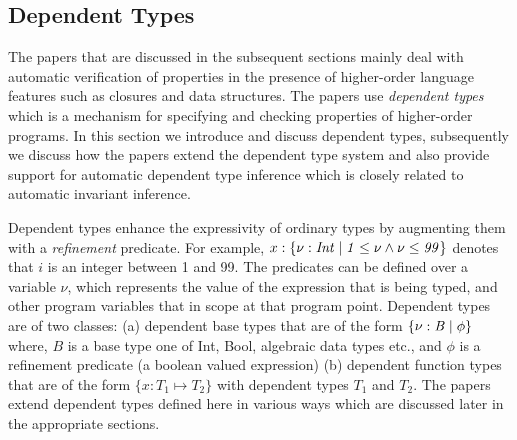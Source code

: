 \newcommand{\dt}[2]{\mathit{\{ #1 \vbar #2\}}}
\newcommand{\subtype}{\mathit{<:}}
\newcommand{\sem}[1]{\sembrack{#1}}

\subsection{Dependent Types}

The papers that are discussed in the subsequent sections mainly deal with 
automatic verification of properties in the presence of higher-order language features such as closures and data structures.
The papers use \emph{dependent types} which is a mechanism for specifying and checking properties of higher-order programs. In this section we introduce and discuss dependent types, subsequently we discuss how the papers extend the dependent type system and also provide support for automatic dependent type inference which is closely related to automatic invariant inference.

Dependent types enhance the expressivity of ordinary types by augmenting them with a \emph{refinement} predicate. For example, $x:\dt{\nu: Int}{1 \le \nu \wedge \nu \le 99}$ denotes that $i$ is an integer between 1 and 99. The predicates can be defined over a variable $\nu$, which represents the value of the expression that is being typed, and other program variables that in scope at that program point.
Dependent types are of two classes: (a) dependent base types that are of the form $\dt{\nu:B}{\phi}$ where, $B$ is a base type one of Int, Bool, algebraic data types etc., and $\phi$ is a refinement predicate (a boolean valued expression)
(b) dependent function types that are of the form $\{ x:T_1 \mapsto T_2\}$ 
with dependent types $T_1$ and $T_2$.
The papers extend dependent types defined here in various ways which are discussed later in the appropriate sections.
 
